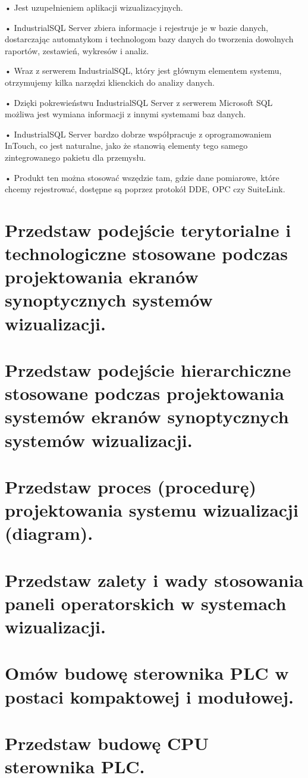 \documentclass{article}
\begin{document}
	• Jest uzupełnieniem aplikacji wizualizacyjnych.
	
	• IndustrialSQL Server zbiera informacje i rejestruje je w bazie danych,
	dostarczając automatykom i technologom bazy danych do tworzenia
	dowolnych raportów, zestawień, wykresów i analiz.
	
	• Wraz z serwerem IndustrialSQL, który jest głównym elementem
	systemu, otrzymujemy kilka narzędzi klienckich do analizy danych.
	
	• Dzięki pokrewieństwu IndustrialSQL Server z serwerem Microsoft SQL
	możliwa jest wymiana informacji z innymi systemami baz danych.
	
	• IndustrialSQL Server bardzo dobrze współpracuje z oprogramowaniem
	InTouch, co jest naturalne, jako że stanowią elementy tego samego
	zintegrowanego pakietu dla przemysłu.
	
	• Produkt ten można stosować wszędzie tam, gdzie dane pomiarowe,
	które chcemy rejestrować, dostępne są poprzez protokół DDE, OPC czy
	SuiteLink.
	
	\section{Przedstaw podejście terytorialne i technologiczne stosowane podczas projektowania	ekranów synoptycznych systemów wizualizacji.}
	\section{Przedstaw podejście hierarchiczne stosowane podczas projektowania systemów	ekranów synoptycznych systemów wizualizacji.}
	\section{Przedstaw proces (procedurę) projektowania systemu wizualizacji (diagram).}
	\section{ Przedstaw zalety i wady stosowania paneli operatorskich w systemach wizualizacji.}
	\section{ Omów budowę sterownika PLC w postaci kompaktowej i modułowej.}
	\section{ Przedstaw budowę CPU sterownika PLC.}
	
\label{LastPage}
\end{document}
